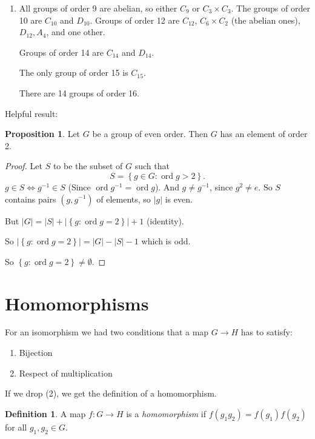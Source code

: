 \documentclass{article}
\theoremstyle{definition}
\newtheorem{definition}{Definition}
\newtheorem{proposition}{Proposition}
\DeclareMathOperator{\ord}{\text{ord}}
\begin{document}
\begin{enumerate}
\item All groups of order 9 are abelian, so either $C_9$ or $C_3 \times C_3$.
  The groups of order 10 are $C_{10}$ and $D_{10}$. Groups of order 12 are $C_{12}$, $ C_{6} \times C_2$ (the abelian ones), $D_{12},A_{4}$, and one other. 

  Groups of order 14 are $C_{14}$ and $D_{14}$. 

  The only group of order 15 is $C_{15}$.

  There are 14 groups of order 16.
\end{enumerate}

Helpful result:
\begin{proposition}
  Let $G$ be a group of even order. Then $G$ has an element of order 2.
\end{proposition}

\begin{proof}
  Let $S$ to be the subset of $G$ such that 
  \begin{equation*}
    S = \left\{ g \in G : \ord g > 2 \right\}.
  \end{equation*}
  $g \in S \iff g^{-1} \in S$ (Since $\ord g^{-1} = \ord g$). And $g \neq g^{-1}$, since $g^2 \neq e$. So $S$ contains pairs $(g,g^{-1})$ of elements, so $|g|$ is even. 

  But $|G|=|S| + |\left\{ g : \ord g=2 \right\}| + 1$ (identity). 

  So $|\left\{ g : \ord g = 2 \right\}|=|G|-|S|-1$ which is odd. 

  So $\left\{ g : \ord g = 2 \right\} \neq \emptyset.$

\end{proof}


\section{Homomorphisms}

For an isomorphism we had two conditions that a map $G \rightarrow H$ has to satisfy:

\begin{enumerate}
  \item Bijection
  \item Respect of multiplication
\end{enumerate}

If we drop (2), we get the definition of a homomorphism.\\

\begin{definition}
  A map $f:G \rightarrow H$ is a \emph{homomorphism} if $f(g_1 g_2)=f(g_1)f(g_2)$ for all $g_1,g_2 \in G.$\\
\end{definition}
\end{document}
